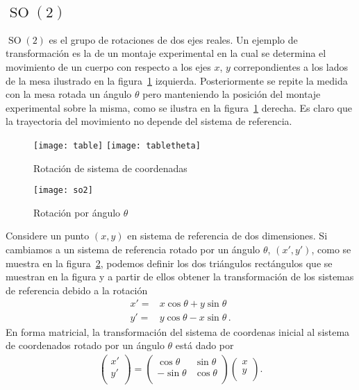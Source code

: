 \subsection{$\operatorname{SO}(2)$}



$\operatorname{SO}(2)$ es el grupo de rotaciones de dos ejes reales. Un ejemplo de transformación es la de un montaje experimental en la cual se determina el movimiento de un cuerpo con respecto a los ejes $x$, $y$ correpondientes a los lados de la mesa ilustrado en la figura~\ref{fig:tabla} izquierda. Posteriormente se repite la medida con la mesa rotada un ángulo $\theta$ pero manteniendo la posición del montaje experimental sobre la misma, como se ilustra en la figura~\ref{fig:tabla} derecha. Es claro que la trayectoria del movimiento no depende del sistema de referencia.
\begin{figure}
  \centering
  \texttt{[image: table]}
  \texttt{[image: tabletheta]}
  \caption{Rotación de sistema de coordenadas}
  \label{fig:tabla}
\end{figure}




\begin{figure}
  \centering
  \texttt{[image: so2]}
  \caption{Rotación por ángulo $\theta$}
  \label{fig:so2}
\end{figure}



Considere un punto $(x,y)$ en sistema de referencia de dos dimensiones. Si cambiamos a un sistema de referencia rotado por un ángulo $\theta$, $(x',y')$, como se muestra en la figura~\ref{fig:so2}, podemos definir los dos triángulos rectángulos que se muestran en la figura y a partir de ellos obtener la transformación de los sistemas de referencia debido a la rotación
\begin{align}
  x'=&x\cos\theta+y\sin\theta \nonumber\\
  y'=&y\cos\theta-x\sin\theta\,.
\end{align}
En forma matricial, la transformación del sistema de coordenas inicial al sistema de coordenados rotado por un ángulo $\theta$ está dado por
\begin{align}
  \begin{pmatrix}
    x'\\
    y'\\
  \end{pmatrix}=
  \begin{pmatrix}
    \cos\theta & \sin\theta\\
    -\sin\theta& \cos\theta\\
  \end{pmatrix}
  \begin{pmatrix}
    x\\
    y\\
  \end{pmatrix}.
\end{align}

